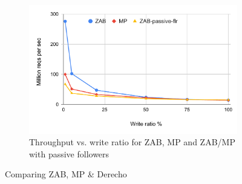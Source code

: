 \begin{figure}[t]
\begin{subfigure}[b]{0.33\textwidth}
    \includegraphics[width=\textwidth]{1_figures/zab-passive-flr.pdf}
    \vspace{-1.8em}
    \caption{Throughput vs. write ratio for ZAB, MP and ZAB/MP with passive followers}
  \label{fig:zab-psv}
  \end{subfigure}
  \caption{Comparing ZAB, MP \& Derecho}
  \label{fig:lto}
\end{figure}



  


